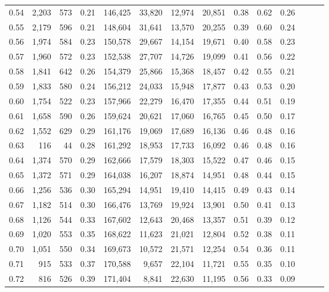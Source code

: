 \begin{tabular}{rrrrrrrrrrrrrr}
0.54 &  2,203 &  573 &  0.21 &  146,425 &   33,820 &  12,974 &  20,851 &  0.38 &  0.62 &      0.26 \\
0.55 &  2,179 &  596 &  0.21 &  148,604 &   31,641 &  13,570 &  20,255 &  0.39 &  0.60 &      0.24 \\
0.56 &  1,974 &  584 &  0.23 &  150,578 &   29,667 &  14,154 &  19,671 &  0.40 &  0.58 &      0.23 \\
0.57 &  1,960 &  572 &  0.23 &  152,538 &   27,707 &  14,726 &  19,099 &  0.41 &  0.56 &      0.22 \\
0.58 &  1,841 &  642 &  0.26 &  154,379 &   25,866 &  15,368 &  18,457 &  0.42 &  0.55 &      0.21 \\
0.59 &  1,833 &  580 &  0.24 &  156,212 &   24,033 &  15,948 &  17,877 &  0.43 &  0.53 &      0.20 \\
0.60 &  1,754 &  522 &  0.23 &  157,966 &   22,279 &  16,470 &  17,355 &  0.44 &  0.51 &      0.19 \\
0.61 &  1,658 &  590 &  0.26 &  159,624 &   20,621 &  17,060 &  16,765 &  0.45 &  0.50 &      0.17 \\
0.62 &  1,552 &  629 &  0.29 &  161,176 &   19,069 &  17,689 &  16,136 &  0.46 &  0.48 &      0.16 \\
0.63 &    116 &   44 &  0.28 &  161,292 &   18,953 &  17,733 &  16,092 &  0.46 &  0.48 &      0.16 \\
0.64 &  1,374 &  570 &  0.29 &  162,666 &   17,579 &  18,303 &  15,522 &  0.47 &  0.46 &      0.15 \\
0.65 &  1,372 &  571 &  0.29 &  164,038 &   16,207 &  18,874 &  14,951 &  0.48 &  0.44 &      0.15 \\
0.66 &  1,256 &  536 &  0.30 &  165,294 &   14,951 &  19,410 &  14,415 &  0.49 &  0.43 &      0.14 \\
0.67 &  1,182 &  514 &  0.30 &  166,476 &   13,769 &  19,924 &  13,901 &  0.50 &  0.41 &      0.13 \\
0.68 &  1,126 &  544 &  0.33 &  167,602 &   12,643 &  20,468 &  13,357 &  0.51 &  0.39 &      0.12 \\
0.69 &  1,020 &  553 &  0.35 &  168,622 &   11,623 &  21,021 &  12,804 &  0.52 &  0.38 &      0.11 \\
0.70 &  1,051 &  550 &  0.34 &  169,673 &   10,572 &  21,571 &  12,254 &  0.54 &  0.36 &      0.11 \\
0.71 &    915 &  533 &  0.37 &  170,588 &    9,657 &  22,104 &  11,721 &  0.55 &  0.35 &      0.10 \\
0.72 &    816 &  526 &  0.39 &  171,404 &    8,841 &  22,630 &  11,195 &  0.56 &  0.33 &      0.09 \\

\end{tabular}
